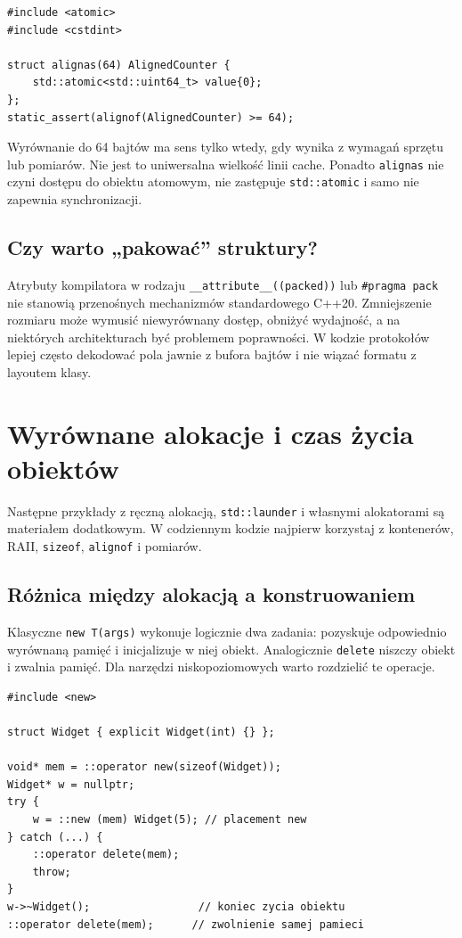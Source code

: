 \begin{lstlisting}
#include <atomic>
#include <cstdint>

struct alignas(64) AlignedCounter {
    std::atomic<std::uint64_t> value{0};
};
static_assert(alignof(AlignedCounter) >= 64);
\end{lstlisting}

Wyrównanie do 64 bajtów ma sens tylko wtedy, gdy wynika z wymagań
sprzętu lub pomiarów. Nie jest to uniwersalna wielkość linii cache.
Ponadto \texttt{alignas} nie czyni dostępu do obiektu atomowym,
nie zastępuje \texttt{std::atomic} i samo nie zapewnia synchronizacji.

\subsection{Czy warto „pakować” struktury?}

Atrybuty kompilatora w rodzaju \texttt{\_\_attribute\_\_((packed))}
lub \texttt{\#pragma pack} nie stanowią przenośnych mechanizmów
standardowego C++20. Zmniejszenie rozmiaru może wymusić niewyrównany
dostęp, obniżyć wydajność, a na niektórych architekturach być
problemem poprawności. W kodzie protokołów lepiej często dekodować
pola jawnie z bufora bajtów i nie wiązać formatu z layoutem klasy.

\section{Wyrównane alokacje i czas życia obiektów}
\label{sec:cpp10-lifetime}

Następne przykłady z ręczną alokacją, \texttt{std::launder} i własnymi
alokatorami są materiałem dodatkowym. W codziennym kodzie najpierw
korzystaj z kontenerów, RAII, \texttt{sizeof}, \texttt{alignof} i pomiarów.

\subsection{Różnica między alokacją a konstruowaniem}

Klasyczne \texttt{new T(args)} wykonuje logicznie dwa zadania:
pozyskuje odpowiednio wyrównaną pamięć i inicjalizuje w niej obiekt.
Analogicznie \texttt{delete} niszczy obiekt i zwalnia pamięć.
Dla narzędzi niskopoziomowych warto rozdzielić te operacje.

\begin{lstlisting}
#include <new>

struct Widget { explicit Widget(int) {} };

void* mem = ::operator new(sizeof(Widget));
Widget* w = nullptr;
try {
    w = ::new (mem) Widget(5); // placement new
} catch (...) {
    ::operator delete(mem);
    throw;
}
w->~Widget();                 // koniec zycia obiektu
::operator delete(mem);      // zwolnienie samej pamieci
\end{lstlisting}

